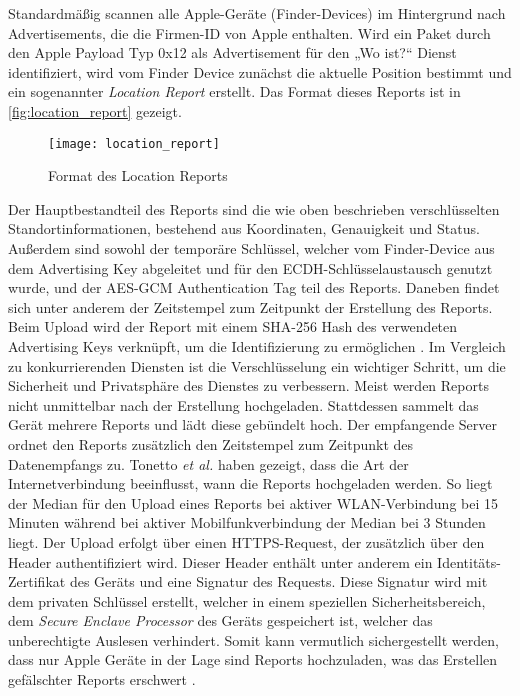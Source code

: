 Standardmäßig scannen alle Apple-Geräte (Finder-Devices) im Hintergrund nach Advertisements, die die Firmen-ID von Apple enthalten.
Wird ein Paket durch den Apple Payload Typ 0x12 als Advertisement für den „Wo ist?“ Dienst identifiziert, wird vom Finder Device zunächst die aktuelle Position bestimmt und ein sogenannter \textit{Location Report} erstellt.
Das Format dieses Reports ist in \autoref{fig:location_report} gezeigt.
\begin{figure}
    \centering
    \texttt{[image: location\_report]}
    \caption{Format des Location Reports \cite{Heinrich_FindMy}}
    \label{fig:location_report}
\end{figure}
Der Hauptbestandteil des Reports sind die wie oben beschrieben verschlüsselten Standortinformationen, bestehend aus Koordinaten, Genauigkeit und Status.
Außerdem sind sowohl der temporäre Schlüssel, welcher vom Finder-Device aus dem Advertising Key abgeleitet und für den \ac{ECDH}-Schlüsselaustausch genutzt wurde, und der \ac{AES}-\ac{GCM} Authentication Tag teil des Reports.
Daneben findet sich unter anderem der Zeitstempel zum Zeitpunkt der Erstellung des Reports.
Beim Upload wird der Report mit einem \ac{SHA}-256 Hash des verwendeten Advertising Keys verknüpft, um die Identifizierung zu ermöglichen \cite{Heinrich_FindMy}.
Im Vergleich zu konkurrierenden Diensten ist die Verschlüsselung ein wichtiger Schritt, um die Sicherheit und Privatsphäre des Dienstes zu verbessern.
Meist werden Reports nicht unmittelbar nach der Erstellung hochgeladen.
Stattdessen sammelt das Gerät mehrere Reports und lädt diese gebündelt hoch.
Der empfangende Server ordnet den Reports zusätzlich den Zeitstempel zum Zeitpunkt des Datenempfangs zu.
Tonetto \textit{et al.} \cite{Tonetto_FindMy} haben gezeigt, dass die Art der Internetverbindung beeinflusst, wann die Reports hochgeladen werden.
So liegt der Median für den Upload eines Reports bei aktiver WLAN-Verbindung bei 15 Minuten während bei aktiver Mobilfunkverbindung der Median bei 3 Stunden liegt.
Der Upload erfolgt über einen HTTPS-Request, der zusätzlich über den Header authentifiziert wird.
Dieser Header enthält unter anderem ein Identitäts-Zertifikat des Geräts und eine Signatur des Requests.
Diese Signatur wird mit dem privaten Schlüssel erstellt, welcher in einem speziellen Sicherheitsbereich, dem \textit{Secure Enclave Processor} des Geräts gespeichert ist, welcher das unberechtigte Auslesen verhindert.
Somit kann vermutlich sichergestellt werden, dass nur Apple Geräte in der Lage sind Reports hochzuladen, was das Erstellen gefälschter Reports erschwert \cite{Heinrich_FindMy}.



